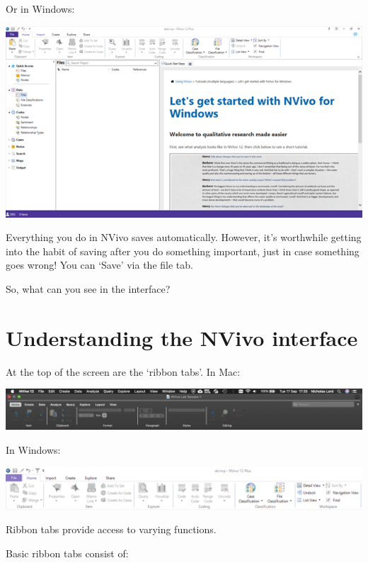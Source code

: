 \documentclass[
]{book}
\begin{document}
Or in Windows:

\includegraphics{imgs/open_windows.png}

Everything you do in NVivo saves automatically. However, it's worthwhile getting into the habit of saving after you do something important, just in case something goes wrong! You can `Save' via the file tab.

So, what can you see in the interface?

\hypertarget{understanding-the-nvivo-interface}{%
\section{Understanding the NVivo interface}\label{understanding-the-nvivo-interface}}

At the top of the screen are the `ribbon tabs'. In Mac:

\includegraphics{imgs/ribbon_mac.png}

In Windows:

\includegraphics{imgs/ribbon_pc.png}

Ribbon tabs provide access to varying functions.

Basic ribbon tabs consist of:
\end{document}
